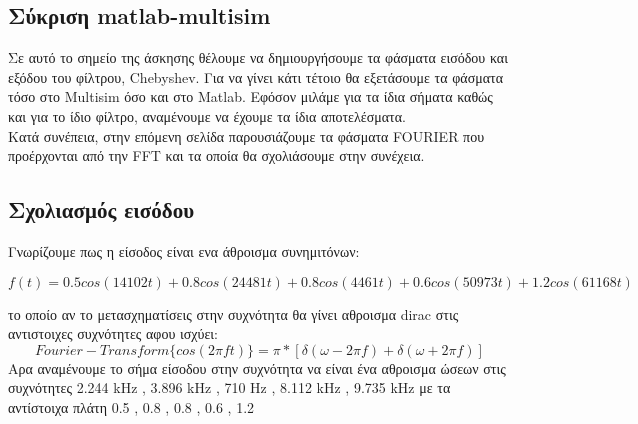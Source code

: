 \documentclass{article}
\begin{document}
{{\subsection*{Σύκριση matlab-multisim}
\large{}
Σε αυτό το σημείο της άσκησης θέλουμε να δημιουργήσουμε τα φάσματα εισόδου και εξόδου του φίλτρου, Chebyshev. Για να γίνει κάτι τέτοιο θα εξετάσουμε τα φάσματα τόσο στο Multisim όσο και στο Matlab. Εφόσον μιλάμε για τα ίδια σήματα καθώς και για το ίδιο φίλτρο, αναμένουμε να έχουμε τα ίδια αποτελέσματα. \\[0.4\baselineskip]
Κατά συνέπεια, στην επόμενη σελίδα παρουσιάζουμε τα φάσματα FOURIER που προέρχονται από την FFT και τα οποία θα σχολιάσουμε στην συνέχεια.
\subsection*{Σχολιασμός εισόδου}
Γνωρίζουμε πως η είσοδος είναι ενα άθροισμα συνημιτόνων:
\begin{changemargin}{-2.5cm}{0.5cm}\begin{equation*}
\boxed{
f(t) =0.5 cos(14102t) + 0.8 cos(24481t) + 0.8cos(4461t) + 0.6cos(50973t) + 1.2cos(61168t) }
\end{equation*}
\end{changemargin}
 το οποίο αν το μετασχηματίσεις στην συχνότητα θα γίνει αθροισμα dirac στις αντιστοιχες συχνότητες αφου ισχύει:
\begin{equation*}
\boxed{
Fourier-Transform \{cos(2πft)\} = π * [δ(ω-2πf) + δ(ω+2πf)]}
\end{equation*}
Αρα αναμένουμε το σήμα είσοδου στην συχνότητα να είναι ένα αθροισμα ώσεων στις συχνότητες  2.244 kHz , 3.896 kHz , 710 Hz , 8.112 kHz , 9.735 kHz με τα αντίστοιχα πλάτη 0.5 , 0.8 , 0.8 , 0.6 , 1.2 
}}
\end{document}
